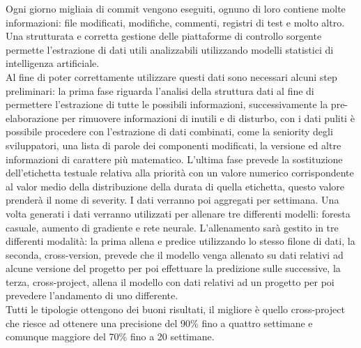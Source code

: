 \documentclass[%
    corpo=12pt,
    twoside,
    oldstyle,
    autoretitolo,
    greek,
    evenboxes,
]{toptesi}
\begin{document}


%

\renewcommand*\IDlabel{}
%







\frontespizio
\summary
Ogni giorno migliaia di commit vengono eseguiti, ognuno di loro contiene molte informazioni: file modificati, modifiche, commenti, registri di test e molto altro. Una strutturata e corretta gestione delle piattaforme di controllo sorgente permette l'estrazione di dati utili analizzabili utilizzando modelli statistici di intelligenza artificiale.\\
Al fine di poter correttamente utilizzare questi dati sono necessari alcuni step preliminari: la prima fase riguarda l'analisi della struttura dati al fine di permettere l'estrazione di tutte le possibili informazioni, successivamente la pre-elaborazione per rimuovere informazioni di inutili e di disturbo, con i dati puliti è possibile procedere con l'estrazione di dati combinati, come la seniority degli sviluppatori, una lista di parole dei componenti modificati, la versione ed altre informazioni di carattere più matematico. L'ultima fase prevede la sostituzione dell'etichetta testuale relativa alla priorità con un valore numerico corrispondente al valor medio della distribuzione della durata di quella etichetta, questo valore prenderà il nome di severity. I dati verranno poi aggregati per settimana.
Una volta generati i dati verranno utilizzati per allenare tre differenti modelli: foresta casuale, aumento di gradiente e rete neurale. L'allenamento sarà gestito in tre differenti modalità: la prima allena e predice utilizzando lo stesso filone di dati, la seconda, cross-version, prevede che il modello venga allenato su dati relativi ad alcune versione del progetto per poi effettuare la predizione sulle successive, la terza, cross-project, allena il modello con dati relativi ad un progetto per poi prevedere l'andamento di uno differente.\\
Tutti le tipologie ottengono dei buoni risultati, il migliore è quello cross-project che riesce ad ottenere una precisione del 90\% fino a quattro settimane e comunque maggiore del 70\% fino a 20 settimane.
\end{document}
